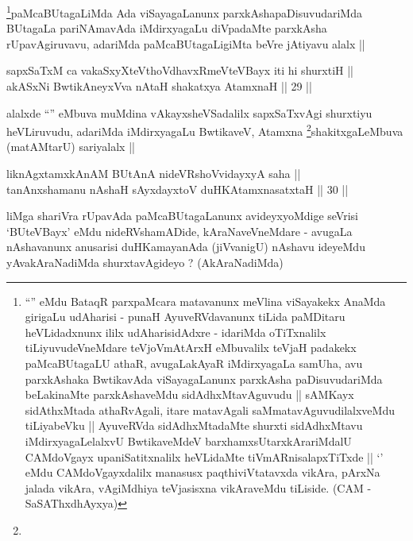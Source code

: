\begin{artha}
\footnote[2]{``\stext'' eMdu BataqR parxpaMcara matavanunx meVlina
viSayakekx AnaMda girigaLu udAharisi - punaH AyuveRVdavanunx tiLida
paMDitaru heVLidadxnunx ililx udAharisidAdxre - 
\stext 
idariMda oTiTxnalilx tiLiyuvudeVneMdare teVjoVmAtArxH eMbuvalilx
teVjaH padakekx paMcaBUtagaLU athaR, avugaLakAyaR iMdirxyagaLa samUha,
avu parxkAshaka BwtikavAda viSayagaLanunx parxkAsha paDisuvudariMda
beLakinaMte parxkAshaveMdu sidAdhxMtavAguvudu || sAMKayx sidAthxMtada
athaRvAgali, itare matavAgali saMmatavAguvudilalxveMdu tiLiyabeVku ||
AyuveRVda sidAdhxMtadaMte shurxti sidAdhxMtavu iMdirxyagaLelalxvU
BwtikaveMdeV barxhamxsUtarxkArariMdalU CAMdoVgayx upaniSatitxnalilx
heVLidaMte tiVmARnisalapxTiTxde || `\stext' eMdu CAMdoVgayxdalilx
manasusx paqthiviVtatavxda vikAra, pArxNa jalada vikAra, vAgiMdhiya
teVjasisxna vikAraveMdu tiLiside. (CAM - SaSAThxdhAyxya)}paMcaBUtagaLiMda Ada viSayagaLanunx
parxkAshapaDisuvudariMda BUtagaLa pariNAmavAda iMdirxyagaLu diVpadaMte
parxkAsha rUpavAgiruvavu, adariMda paMcaBUtagaLigiMta beVre jAtiyavu
alalx ||
\end{artha}


\begin{shl}
sapxSaTxM ca vakaSxyXteV\s thoVdhavxRmeVteVBayx iti hi shurxtiH || \\
akASxNi BwtikAneyxVva nAtaH shakatxya AtamxnaH ||  29 ||  
\end{shl}

\begin{artha}
alalxde ``\stext'' eMbuva muMdina vAkayxsheVSadalilx sapxSaTxvAgi
shurxtiyu heVLiruvudu, adariMda iMdirxyagaLu BwtikaveV,
Atamxna \footnote[1]{}shakitxgaLeMbuva (matAMtarU) sariyalalx ||
\end{artha}


\begin{shl}
liknAgxtamxkAnAM BUtAnA nideVRshoV\s vidayxyA saha || \\
tanAnxshamanu nAshaH sAyxdayxtoV duHKAtamxnasatxtaH ||  30 ||  
\end{shl}

\begin{artha}
liMga shariVra rUpavAda paMcaBUtagaLanunx avideyxyoMdige seVrisi
`BUteVBayx' eMdu nideRVshamADide, kAraNaveVneMdare - avugaLa
nAshavanunx anusarisi duHKamayanAda (jiVvanigU) nAshavu ideyeMdu
yAvakAraNadiMda shurxtavAgideyo ? (AkAraNadiMda)
\end{artha}

